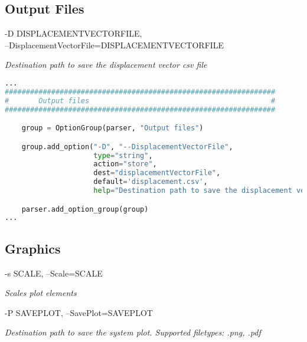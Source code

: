\subsection{Output Files}
\label{subsec:outputFiles}

-D DISPLACEMENTVECTORFILE,\\
--DisplacementVectorFile=DISPLACEMENTVECTORFILE 

\textit{Destination path to save the displacement vector csv file}


\begin{inconsolata}
\begin{minipage}{\linewidth}
\begin{lstlisting}[language=python]
...
################################################################
#       Output files                                           #
################################################################

    group = OptionGroup(parser, "Output files")

    group.add_option("-D", "--DisplacementVectorFile",
                     type="string",
                     action="store",
                     dest="displacementVectorFile",
                     default='displacement.csv',
                     help="Destination path to save the displacement vector csv file")

    parser.add_option_group(group)
...
\end{lstlisting}
\end{minipage}
\end{inconsolata}


\subsection{Graphics}
\label{subsec:graphics}

-s SCALE, --Scale=SCALE

\textit{Scales plot elements}

-P SAVEPLOT, --SavePlot=SAVEPLOT

\textit{Destination path to save the system plot. Supported filetypes: .png, .pdf}


